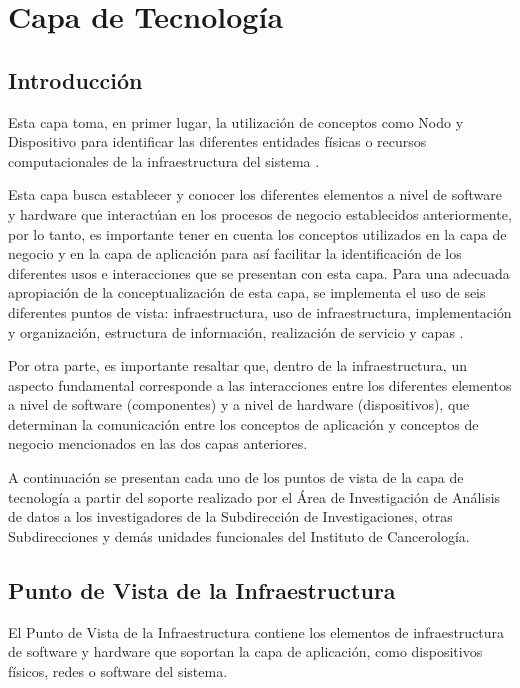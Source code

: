 \chapter{Capa de Tecnología}
\section{Introducción}
Esta capa toma, en primer lugar, la utilización de conceptos como Nodo y Dispositivo para identificar las diferentes entidades físicas o recursos computacionales de la infraestructura del sistema \cite{BolanosCastro2019}.

Esta capa  busca establecer y conocer los diferentes elementos a nivel de software y hardware que interactúan en los procesos de negocio establecidos anteriormente, por lo tanto, es importante tener en cuenta los conceptos utilizados en la capa de negocio y en la capa de aplicación para así facilitar la identificación de los diferentes usos e interacciones que se presentan con esta capa. Para una adecuada apropiación de la conceptualización de esta capa, se implementa el uso de seis diferentes puntos de vista: infraestructura, uso de infraestructura, implementación y organización, estructura de información, realización de servicio y capas \cite{BolanosCastro2019}.

Por otra parte, es importante resaltar que, dentro de la infraestructura, un aspecto fundamental corresponde a las interacciones entre los diferentes elementos a nivel de software (componentes) y a nivel de hardware (dispositivos), que determinan la comunicación entre los conceptos de aplicación  y conceptos de negocio mencionados en las dos capas anteriores\cite{BolanosCastro2019}.

A continuación se presentan cada uno de los puntos de vista de la capa de tecnología  a partir del soporte realizado por el Área de Investigación de Análisis de datos a los investigadores de la Subdirección de Investigaciones, otras Subdirecciones y demás unidades funcionales del Instituto de Cancerología.

\newpage
\section{Punto de Vista de la Infraestructura}
El Punto de Vista de la Infraestructura contiene los elementos de infraestructura de software y hardware que soportan la capa de aplicación, como dispositivos físicos, redes o software del sistema\cite{BolanosCastro2019}.

